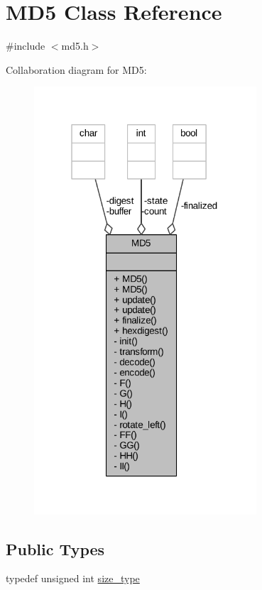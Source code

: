 \hypertarget{class_m_d5}{}\section{M\+D5 Class Reference}
\label{class_m_d5}


{\ttfamily \#include $<$md5.\+h$>$}



Collaboration diagram for M\+D5\+:
\nopagebreak
\begin{figure}[H]
\begin{center}
\leavevmode
\includegraphics[width=235pt]{class_m_d5__coll__graph}
\end{center}
\end{figure}
\subsection*{Public Types}
\begin{DoxyCompactItemize}
\item 
typedef unsigned int \hyperlink{class_m_d5_aa836972700679dbcff6ae8337f6db464}{size\+\_\+type}
\end{DoxyCompactItemize}
